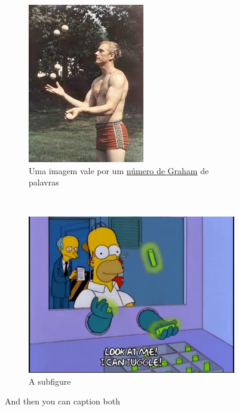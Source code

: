 \documentclass[10pt]{article}
\begin{document}
\begin{figure}[H]
\centering
\begin{subfigure}{.3\textwidth}
  \centering
  \includegraphics[width=.5\linewidth]{ron_graham_juggling.jpeg}
  \caption{Uma imagem vale por um \href{https://www.youtube.cuom/watch?v=XTeJ64KD5cg}{número de Graham} de palavras}
  \label{fig:sub1}
\end{subfigure}%
~
\begin{subfigure}{.3\textwidth}
  \centering
  \includegraphics[width=.5\linewidth]{homer_juggling.png}
  \caption{A subfigure}
  \label{fig:sub2}
\end{subfigure}
\caption{And then you can caption both}
\label{fig:test}
\end{figure}
\end{document}
